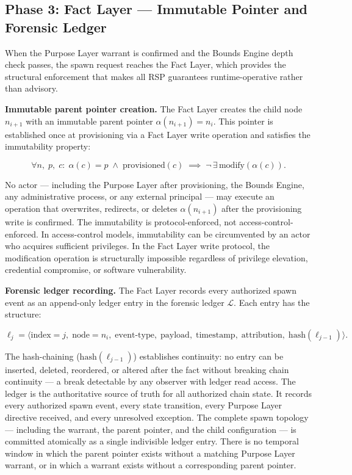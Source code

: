 \subsection{Phase 3: Fact Layer --- Immutable Pointer and Forensic Ledger}
\label{sec:rs-fact-layer}

When the Purpose Layer warrant is confirmed and the Bounds Engine depth check passes, the spawn request reaches the Fact Layer, which provides the structural enforcement that makes all RSP guarantees runtime-operative rather than advisory.

\medskip
\noindent\textbf{Immutable parent pointer creation.} The Fact Layer creates the child node $n_{i+1}$ with an immutable parent pointer $\alpha(n_{i+1}) = n_i$. This pointer is established once at provisioning via a Fact Layer write operation and satisfies the immutability property:

\begin{equation}
\forall n,\; p,\; c:\;
\alpha(c) = p \;\land\; \text{provisioned}(c)
\;\implies\;
\neg\,\exists\,\text{modify}(\alpha(c)).
\label{eq:pointer-immutability}
\end{equation}

No actor --- including the Purpose Layer after provisioning, the Bounds Engine, any administrative process, or any external principal --- may execute an operation that overwrites, redirects, or deletes $\alpha(n_{i+1})$ after the provisioning write is confirmed. The immutability is protocol-enforced, not access-control-enforced. In access-control models, immutability can be circumvented by an actor who acquires sufficient privileges. In the Fact Layer write protocol, the modification operation is structurally impossible regardless of privilege elevation, credential compromise, or software vulnerability.

\medskip
\noindent\textbf{Forensic ledger recording.} The Fact Layer records every authorized spawn event as an append-only ledger entry in the forensic ledger $\mathcal{L}$. Each entry has the structure:

\begin{equation}
\ell_j = \bigl\langle
\text{index}=j,\;
\text{node}=n_i,\;
\text{event-type},\;
\text{payload},\;
\text{timestamp},\;
\text{attribution},\;
\text{hash}(\ell_{j-1})
\bigr\rangle .
\label{eq:ledger-entry}
\end{equation}

The hash-chaining ($\text{hash}(\ell_{j-1})$) establishes continuity: no entry can be inserted, deleted, reordered, or altered after the fact without breaking chain continuity --- a break detectable by any observer with ledger read access. The ledger is the authoritative source of truth for all authorized chain state. It records every authorized spawn event, every state transition, every Purpose Layer directive received, and every unresolved exception. The complete spawn topology --- including the warrant, the parent pointer, and the child configuration --- is committed atomically as a single indivisible ledger entry. There is no temporal window in which the parent pointer exists without a matching Purpose Layer warrant, or in which a warrant exists without a corresponding parent pointer.

